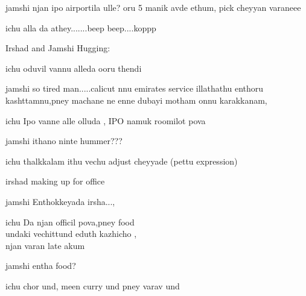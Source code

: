 \documentclass{screenplay}[2012/06/30]
\begin{document}
\begin{dialogue}{jamshi}
njan ipo airportila ulle? oru 5 manik avde ethum, pick cheyyan varaneee
\end{dialogue}

\begin{dialogue}{ichu}
alla da athey.......beep beep....koppp
\end{dialogue}

Irshad and Jamshi Hugging:

\begin{dialogue}{ichu}
oduvil vannu alleda ooru thendi
\end{dialogue}

\begin{dialogue}{jamshi}
so tired man.....calicut nnu emirates service illathathu enthoru kashttamnu,pney machane ne enne dubayi motham onnu karakkanam,
\end{dialogue}

\begin{dialogue}{ichu}
Ipo vanne alle olluda , IPO namuk roomilot pova
\end{dialogue}

\begin{dialogue}{jamshi}
ithano ninte hummer???
\end{dialogue}

\begin{dialogue}{ichu}
thalkkalam ithu vechu adjust cheyyade (pettu expression)
\end{dialogue}


irshad making up for office

\begin{dialogue}{jamshi}
Enthokkeyada irsha...,
\end{dialogue}

\begin{dialogue}{ichu}
Da njan officil pova,pney food \\
undaki vechittund eduth kazhicho , \\
njan varan late akum
\end{dialogue}

\begin{dialogue}{jamshi}
entha food?
\end{dialogue}

\begin{dialogue}{ichu}
chor und, meen curry und pney varav und
\end{dialogue}
\end{document}
